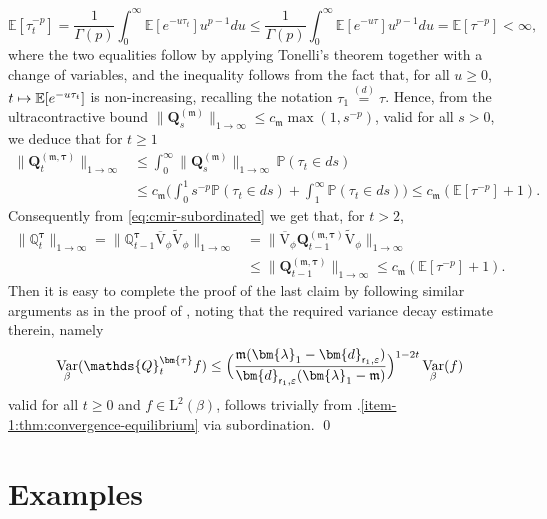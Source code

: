 \documentclass[10pt]{amsart}
\let\epsilon\varepsilon
\newcommand\mto{\mathchoice{\longmapsto}{\mapsto}{\mapsto}{\mapsto}}
\theoremstyle{plain}
\theoremstyle{definition}
\DeclareMathOperator{\Var}{Var}
\newcommand{\E}{\mathbb{E}}
\newcommand{\Prob}{\mathbb{P}}
\newcommand{\J}{\mathds{Q}}
\newcommand{\Leb}{\mathrm{L}}
\newcommand{\m}{\mathfrak{m}}
\newcommand{\dpt}{\bm{d}_{\vat,\epsilon}}
\newcommand{\lam}{{\bm{\lambda}_1}}
\newcommand{\vat}{{\mathsf{r}_1}}
\newcommand{\Q}[1][\mo]{\mathbf{Q}^{({#1})}}
\let\mo\mu
\let\bpsi\beta
\begin{document}
\begin{equation*}
\E[\tau_t^{-p}] = \frac{1}{\Gamma(p)} \int_0^\infty \E[e^{-u \tau_t}] u^{p-1} du \leq \frac{1}{\Gamma(p)} \int_0^\infty \E[e^{-u \tau}] u^{p-1} du = \E[\tau^{-p}] < \infty,
\end{equation*}
where the two equalities follow by applying Tonelli's theorem together with a change of variables, and the inequality follows from the fact that, for all $u\geq0$, $t \mto \E[e^{-u \tau_t}]$ is non-increasing, recalling the notation $\tau_1\stackrel{(d)}{=}\tau$. Hence, from the ultracontractive bound $\|\Q[\m]_s\|_{1 \to \infty} \leq c_\m \max(1,s^{-p})$, valid for all $s > 0$, we deduce that for $t \geq 1$
\begin{align*}
\|\Q[\m,\bm{\tau}]_t\|_{1 \to \infty} &\leq \int_0^\infty \|\Q[\m]_s\|_{1 \to \infty}\, \Prob(\tau_t \in ds)\\
&\leq c_\m \biggl(\int_0^1 s^{-p} \Prob(\tau_t \in ds) + \int_1^\infty \Prob(\tau_t \in ds)  \biggr) \leq c_\m(\E[\tau^{-p}]+1).
\end{align*}
Consequently from \eqref{eq:cmir-subordinated} we get that, for $t > 2$,
\begin{align*}
\|\J_t^{\bm{\tau}}\|_{1\to\infty} = \|\J_{t-1}^{\bm{\tau}} \overline{\mathrm{V}}_\phi \widetilde{\mathrm{V}}_\phi\|_{1\to\infty} &= \|\overline{\mathrm{V}}_\phi \Q[\m,\bm{\tau}]_{t-1} \widetilde{\mathrm{V}}_\phi\|_{1\to\infty}\\
&\leq \|\Q[\m,\bm{\tau}]_{t-1}\|_{1 \to \infty} \leq c_\m(\E[\tau^{-p}]+1).
\end{align*}
Then it is easy to complete the proof of the last claim by following similar arguments as in the proof of \cite[Prop.\,6.3.4]{Bakry_Book}, noting that the required variance decay estimate therein, namely
\begin{equation*}
\Var_\bpsi(\J_t^{\bm{\tau}} f) \leq \Bigl(\frac{\m(\lam-\dpt)}{\dpt(\lam-\m)}\Bigr)^{1-2t} \Var_\bpsi(f)
\end{equation*}
valid for all $t \geq 0$ and $f \in \Leb^2(\bpsi)$, follows trivially from .\eqref{item-1:thm:convergence-equilibrium} via subordination. \qed

\section{Examples} \label{sec:examples}
\end{document}
